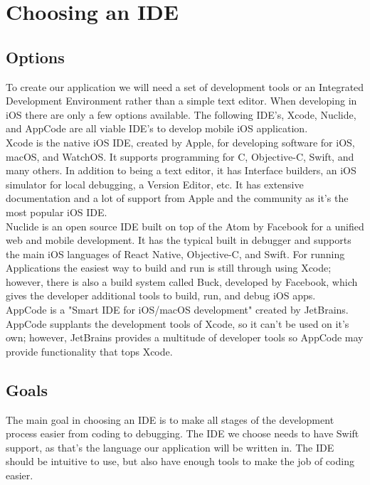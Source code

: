 \documentclass[letterpaper,10pt,titlepage]{article}
\begin{document}
\section{Choosing an IDE}
\subsection{Options}
To create our application we will need a set of development tools or an Integrated Development Environment rather than a simple text editor. When developing in iOS there are only a few options available. The following IDE's, Xcode, Nuclide, and AppCode are all viable IDE's to develop mobile iOS application.\\

Xcode is the native iOS IDE, created by Apple, for developing software for iOS, macOS, and WatchOS. It supports programming for C, Objective-C, Swift, and many others. In addition to being a text editor, it has Interface builders, an iOS simulator for local debugging, a Version Editor, etc. It has extensive documentation and a lot of support from Apple and the community as it's the most popular iOS IDE.\cite{idepara3}\\

Nuclide is an open source IDE built on top of the Atom by Facebook for a unified web and mobile development. It has the typical built in debugger and supports the main iOS languages of React Native, Objective-C, and Swift. For running Applications the easiest way to build and run is still through using Xcode; however, there is also a build system called Buck, developed by Facebook, which gives the developer additional tools to build, run, and debug iOS apps.\cite{idepara1}\\

AppCode is a "Smart IDE for iOS/macOS development" created by JetBrains. AppCode supplants the development tools of Xcode, so it can't be used on it's own; however, JetBrains provides a multitude of developer tools so AppCode may provide functionality that tops Xcode.\cite{idepara2}\\

\subsection{Goals}

The main goal in choosing an IDE is to make all stages of the development process easier from coding to debugging. The IDE we choose needs to have Swift support, as that's the language our application will be written in. The IDE should be intuitive to use, but also have enough tools to make the job of coding easier.\\
\end{document}
